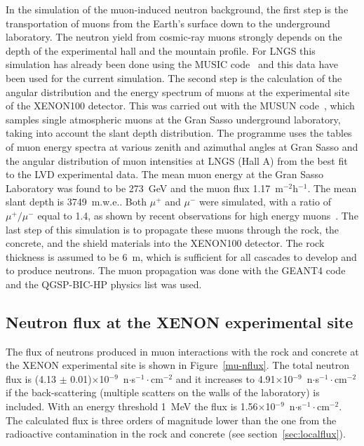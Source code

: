In the simulation of the muon-induced neutron background, the first step is the transportation 
of muons from the Earth's surface
down to the underground laboratory. The neutron yield from cosmic-ray muons strongly
depends on the depth of the experimental hall and the mountain profile. For
LNGS this simulation has already been done using the MUSIC 
code~\cite{music} and this data have been used for the current
simulation.
The second step is the calculation of the angular distribution and the energy
spectrum of muons at the experimental site of the XENON100 detector. 
This was carried out with the MUSUN code~\cite{musun}, which samples single
atmospheric muons at the Gran Sasso underground laboratory, taking into
account the slant depth distribution. 
The programme uses the tables of muon energy spectra at various 
zenith and azimuthal angles at Gran Sasso and the angular distribution of muon 
intensities at LNGS (Hall A) from
the best fit to the LVD experimental data. 
The mean muon energy at the Gran Sasso Laboratory was found to be 273~GeV and the
muon flux 1.17~m$^{-2}$h$^{-1}$.
The mean slant depth is 3749~m.w.e.. 
Both $\mu^{+}$ and $\mu^{-}$  were simulated, with a ratio of $\mu^{+} / \mu^{-}$ equal to
1.4, as shown by recent observations for high energy muons~\cite{mu-ratio}.
The last step of this simulation is to propagate these muons through the rock,
the concrete, and the shield materials into the XENON100 detector. The rock
thickness is assumed to be 6~m, which is sufficient for all cascades
to develop and to produce neutrons. 
The muon propagation was done with the GEANT4 code and the QGSP-BIC-HP physics list
was used.


\subsection{Neutron flux at the XENON experimental site} 

The flux of neutrons produced in muon interactions with the rock
and concrete at the XENON experimental site is shown in Figure~\ref{mu-nflux}. 
The total neutron flux is (4.13 $\pm$ 0.01)$\times$10$^{-9}$~n$\cdot$s$^{-1}\cdot$cm$^{-2}$ and it increases to 
4.91$\times$10$^{-9}$~n$\cdot$s$^{-1}\cdot$cm$^{-2}$ if the back-scattering (multiple
scatters on the walls of the laboratory) is included. With an energy threshold 1~MeV the flux is 1.56$\times$10$^{-9}$~n$\cdot$s$^{-1}\cdot$cm$^{-2}$. 
The calculated flux is three orders of magnitude lower than the one from the radioactive contamination in the rock and concrete (see section~\ref{sec:localflux}).

